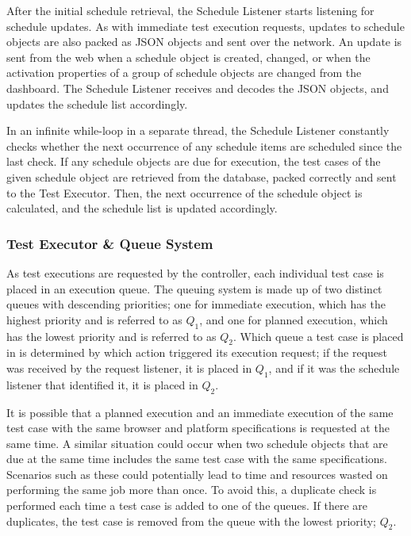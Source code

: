 After the initial schedule retrieval, the Schedule Listener starts listening for schedule updates. As with immediate test execution requests, updates to schedule objects are also packed as JSON objects and sent over the network. An update is sent from the web when a schedule object is created, changed, or when the activation properties of a group of schedule objects are changed from the dashboard. The Schedule Listener receives and decodes the JSON objects, and updates the schedule list accordingly.

In an infinite while-loop in a separate thread, the Schedule Listener constantly checks whether the next occurrence of any schedule items are scheduled since the last check. If any schedule objects are due for execution, the test cases of the given schedule object are retrieved from the database, packed correctly and sent to the Test Executor. Then, the next occurrence of the schedule object is calculated, and the schedule list is updated accordingly.


\subsubsection{Test Executor \& Queue System}

As test executions are requested by the controller, each individual test case is placed in an execution queue. The queuing system is made up of two distinct queues with descending priorities; one for immediate execution, which has the highest priority and is referred to as $Q_1$, and one for planned execution, which has the lowest priority and is referred to as $Q_2$. Which queue a test case is placed in is determined by which action triggered its execution request; if the request was received by the request listener, it is placed in $Q_1$, and if it was the schedule listener that identified it, it is placed in $Q_2$.

It is possible that a planned execution and an immediate execution of the same test case with the same browser and platform specifications is requested at the same time. A similar situation could occur when two schedule objects that are due at the same time includes the same test case with the same specifications. Scenarios such as these could potentially lead to time and resources wasted on performing the same job more than once. To avoid this, a duplicate check is performed each time a test case is added to one of the queues. If there are duplicates, the test case is removed from the queue with the lowest priority; $Q_2$.

